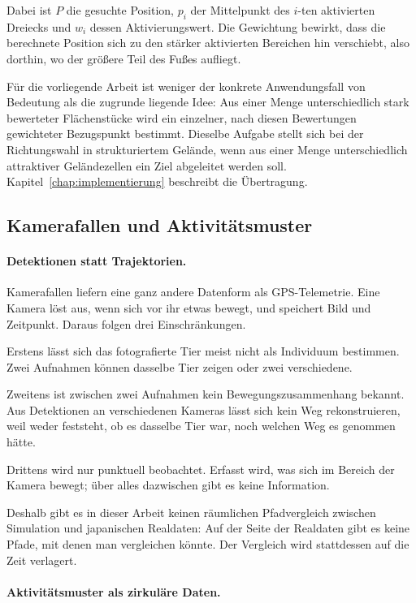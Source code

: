 \documentclass[12pt,a4paper]{report}
\begin{document}
Dabei ist $P$ die gesuchte Position, $p_{i}$ der Mittelpunkt des $i$-ten aktivierten
Dreiecks und $w_{i}$ dessen Aktivierungswert. Die Gewichtung bewirkt, dass die berechnete
Position sich zu den stärker aktivierten Bereichen hin verschiebt, also dorthin, wo der
größere Teil des Fußes aufliegt.

Für die vorliegende Arbeit ist weniger der konkrete Anwendungsfall von Bedeutung als die
zugrunde liegende Idee: Aus einer Menge unterschiedlich stark bewerteter Flächenstücke wird
ein einzelner, nach diesen Bewertungen gewichteter Bezugspunkt bestimmt. Dieselbe Aufgabe
stellt sich bei der Richtungswahl in strukturiertem Gelände, wenn aus einer Menge
unterschiedlich attraktiver Geländezellen ein Ziel abgeleitet werden soll.
Kapitel~\ref{chap:implementierung} beschreibt die Übertragung.

\subsection{Kamerafallen und Aktivitätsmuster}
\label{subsec:kamerafallen}

\paragraph{Detektionen statt Trajektorien.}

Kamerafallen liefern eine ganz andere Datenform als GPS-Telemetrie. Eine Kamera löst aus,
wenn sich vor ihr etwas bewegt, und speichert Bild und Zeitpunkt. Daraus folgen drei
Einschränkungen.

Erstens lässt sich das fotografierte Tier meist nicht als Individuum bestimmen. Zwei
Aufnahmen können dasselbe Tier zeigen oder zwei verschiedene.

Zweitens ist zwischen zwei Aufnahmen kein Bewegungszusammenhang bekannt. Aus Detektionen an
verschiedenen Kameras lässt sich kein Weg rekonstruieren, weil weder feststeht, ob es
dasselbe Tier war, noch welchen Weg es genommen hätte.

Drittens wird nur punktuell beobachtet. Erfasst wird, was sich im Bereich der Kamera bewegt;
über alles dazwischen gibt es keine Information.

Deshalb gibt es in dieser Arbeit keinen räumlichen Pfadvergleich zwischen Simulation und
japanischen Realdaten: Auf der Seite der Realdaten gibt es keine Pfade, mit denen man
vergleichen könnte. Der Vergleich wird stattdessen auf die Zeit verlagert.

\paragraph{Aktivitätsmuster als zirkuläre Daten.}
\end{document}
